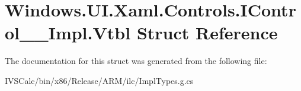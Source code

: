 \hypertarget{struct_windows_1_1_u_i_1_1_xaml_1_1_controls_1_1_i_control_____impl_1_1_vtbl}{}\section{Windows.\+U\+I.\+Xaml.\+Controls.\+I\+Control\+\_\+\+\_\+\+Impl.\+Vtbl Struct Reference}
\label{struct_windows_1_1_u_i_1_1_xaml_1_1_controls_1_1_i_control_____impl_1_1_vtbl}


The documentation for this struct was generated from the following file\+:\begin{DoxyCompactItemize}
\item 
I\+V\+S\+Calc/bin/x86/\+Release/\+A\+R\+M/ilc/Impl\+Types.\+g.\+cs\end{DoxyCompactItemize}
